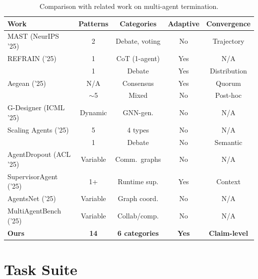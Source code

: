 \documentclass{article}
\begin{document}
\begin{table}[H]
\centering
\caption{Comparison with related work on multi-agent termination.}
\label{tab:related}
{\small
\begin{tabular}{@{}lcccc@{}}
\toprule
\textbf{Work} & \textbf{Patterns} & \textbf{Categories} & \textbf{Adaptive} & \textbf{Convergence} \\
\midrule
MAST (NeurIPS '25) & 2 & Debate, voting & No & Trajectory \\
REFRAIN ('25) & 1 & CoT (1-agent) & Yes & N/A \\
\citet{hu2025when} & 1 & Debate & Yes & Distribution \\
Aegean ('25) & N/A & Consensus & Yes & Quorum \\
\citet{cemri2025why} & $\sim$5 & Mixed & No & Post-hoc \\
G-Designer (ICML '25) & Dynamic & GNN-gen. & No & N/A \\
Scaling Agents ('25) & 5 & 4 types & No & N/A \\
\citet{wang2025rethinking} & 1 & Debate & No & Semantic \\
AgentDropout (ACL '25) & Variable & Comm.\ graphs & No & N/A \\
SupervisorAgent ('25) & 1+ & Runtime sup. & Yes & Context \\
AgentsNet ('25) & Variable & Graph coord. & No & N/A \\
MultiAgentBench ('25) & Variable & Collab/comp. & No & N/A \\
\midrule
\textbf{Ours} & \textbf{14} & \textbf{6 categories} & \textbf{Yes} & \textbf{Claim-level} \\
\bottomrule
\end{tabular}
}
\end{table}

\section{Task Suite}
\label{app:tasks}
\end{document}
